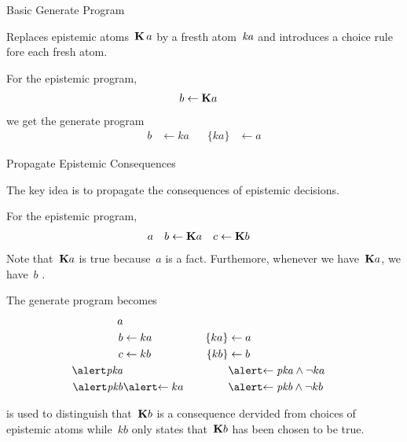 \documentclass[aspectratio=169,svgnames,xcolor=table,t]{beamer}
\begin{document}
\begin{frame}{Basic Generate Program}
    \begin{myitemize}
        \item Replaces epistemic atoms~$\mathbf{K}\,a$ by a fresth atom~$\mathit{ka}$ and introduces a choice rule fore each fresh atom.
    \end{myitemize}
    For the epistemic program, 
    \begin{align*}
        b &\leftarrow \mathbf{K} a
    \end{align*}
    we get the generate program
    \begin{align*}
        b &\leftarrow ka
        &\hspace{10pt}
        \{ ka \} &\leftarrow a
    \end{align*}
\end{frame}
\begin{frame}{Propagate Epistemic Consequences}
    \begin{myitemize}
        \item[] The key idea is to propagate the consequences of epistemic decisions.
    \end{myitemize}
    For the epistemic program, 
    \begin{align*}
        a &&
        b &\leftarrow \mathbf{K} a
        &
        c &\leftarrow \mathbf{K} b
    \end{align*}
    Note that~$\mathbf{K} a$ is true because~$a$ is a fact.
    Furthemore, whenever we have~$\mathbf{K} a$, we have~$b$ .
    
    \pause

    The generate program becomes
    \begin{align*}
        a && 
        \\
        b &\leftarrow ka
        &\hspace{10pt}
        \{ ka \} &\leftarrow a
        \\
        c &\leftarrow kb
        &\hspace{10pt}
        \{ kb \} &\leftarrow b
        \\
        \hi{\kp{a}}&
        &
        &\hi{\leftarrow \kp{a} \wedge \neg ka}
        \\
        \hi{\kp{b}} &\hi{\leftarrow ka}
        &
        &\hi{\leftarrow \kp{b} \wedge \neg kb}
    \end{align*}

     is used to distinguish that~$\mathbf{K} b$ is a consequence dervided from choices of epistemic atoms while~$kb$ only states that~$\mathbf{K} b$ has been chosen to be true.
\end{frame}
\end{document}
